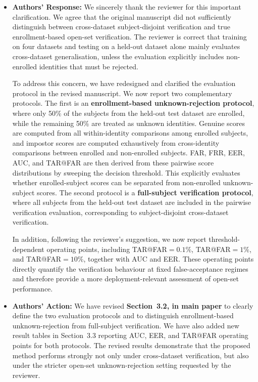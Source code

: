 \documentclass[11pt]{article}
\theoremstyle{remark}
\begin{document}
\begin{itemize}
	\item \textbf{Authors' Response:} 
	We sincerely thank the reviewer for this important clarification. We agree that the original manuscript did not sufficiently distinguish between cross-dataset subject-disjoint verification and true enrollment-based open-set verification. The reviewer is correct that training on four datasets and testing on a held-out dataset alone mainly evaluates cross-dataset generalisation, unless the evaluation explicitly includes non-enrolled identities that must be rejected.

	To address this concern, we have redesigned and clarified the evaluation protocol in the revised manuscript. We now report two complementary protocols. The first is an \textbf{enrollment-based unknown-rejection protocol}, where only 50\% of the subjects from the held-out test dataset are enrolled, while the remaining 50\% are treated as unknown identities. Genuine scores are computed from all within-identity comparisons among enrolled subjects, and impostor scores are computed exhaustively from cross-identity comparisons between enrolled and non-enrolled subjects. FAR, FRR, EER, AUC, and TAR@FAR are then derived from these pairwise score distributions by sweeping the decision threshold. This explicitly evaluates whether enrolled-subject scores can be separated from non-enrolled unknown-subject scores. The second protocol is a \textbf{full-subject verification protocol}, where all subjects from the held-out test dataset are included in the pairwise verification evaluation, corresponding to subject-disjoint cross-dataset verification.

	In addition, following the reviewer’s suggestion, we now report threshold-dependent operating points, including TAR@FAR$=0.1\%$, TAR@FAR$=1\%$, and TAR@FAR$=10\%$, together with AUC and EER. These operating points directly quantify the verification behaviour at fixed false-acceptance regimes and therefore provide a more deployment-relevant assessment of open-set performance.

	\item \textbf{Authors' Action:} 
	We have revised \textbf{Section~3.2, in main paper} to clearly define the two evaluation protocols and to distinguish enrollment-based unknown-rejection from full-subject verification. We have also added new result tables in Section~3.3 reporting AUC, EER, and TAR@FAR operating points for both protocols. The revised results demonstrate that the proposed method performs strongly not only under cross-dataset verification, but also under the stricter open-set unknown-rejection setting requested by the reviewer.
\end{itemize}
\color{blue} 
\end{document}
